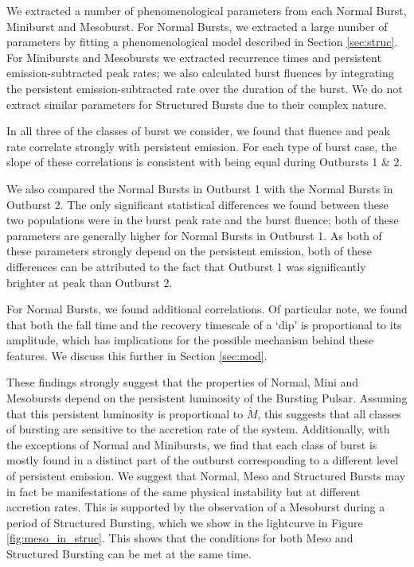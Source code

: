 \par We extracted a number of phenomenological parameters from each Normal Burst, Miniburst and Mesoburst.  For Normal Bursts, we extracted a large number of parameters by fitting a phenomenological model described in Section \ref{sec:struc}.  For Minibursts and Mesobursts we extracted recurrence times and persistent emission-subtracted peak rates; we also calculated burst fluences by integrating the persistent emission-subtracted rate over the duration of the burst.  We do not extract similar parameters for Structured Bursts due to their complex nature.
\par  In all three of the classes of burst we consider, we found that fluence and peak rate correlate strongly with persistent emission.  For each type of burst case, the slope of these correlations is consistent with being equal during Outbursts 1 \& 2.
\par We also compared the Normal Bursts in Outburst 1 with the Normal Bursts in Outburst 2.  The only significant statistical differences we found between these two populations were in the burst peak rate and the burst fluence; both of these parameters are generally higher for Normal Bursts in Outburst 1.  As both of these parameters strongly depend on the persistent emission, both of these differences can be attributed to the fact that Outburst 1 was significantly brighter at peak than Outburst 2.
\par For Normal Bursts, we found additional correlations.  Of particular note, we found that both the fall time and the recovery timescale of a `dip' is proportional to its amplitude, which has implications for the possible mechanism behind these features.  We discuss this further in Section \ref{sec:mod}.
\par These findings strongly suggest that the properties of Normal, Mini and Mesobursts depend on the persistent luminosity of the Bursting Pulsar.  Assuming that this persistent luminosity is proportional to $\dot{M}$, this suggests that all classes of bursting are sensitive to the accretion rate of the system.  Additionally, with the exceptions of Normal and Minibursts, we find that each class of burst is mostly found in a distinct part of the outburst corresponding to a different level of persistent emission.  We suggest that Normal, Meso and Structured Bursts may in fact be manifestations of the same physical instability but at different accretion rates.  This is supported by the observation of a Mesoburst during a period of Structured Bursting, which we show in the lightcurve in Figure \ref{fig:meso_in_struc}.  This shows that the conditions for both Meso and Structured Bursting can be met at the same time.

